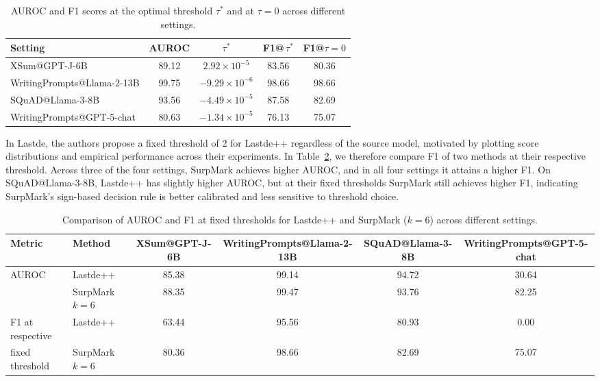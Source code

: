 \documentclass{article}
\theoremstyle{plain}
\theoremstyle{definition}
\theoremstyle{remark}
\begin{document}
\begin{table}[htbp]
\centering
{\scriptsize
\begin{tabular}{l c c c c}
\toprule
Setting                     & AUROC & $\tau^\ast$              & F1@$\,\tau^\ast$ & F1@$\tau=0$ \\
\midrule
XSum@GPT-J-6B               & 89.12 & $2.92\times 10^{-5}$     & 83.56            & 80.36       \\
WritingPrompts@Llama-2-13B  & 99.75 & $-9.29\times 10^{-6}$    & 98.66            & 98.66       \\
SQuAD@Llama-3-8B            & 93.56 & $-4.49\times 10^{-5}$    & 87.58            & 82.69       \\
WritingPrompts@GPT-5-chat   & 80.63 & $-1.34\times 10^{-5}$    & 76.13            & 75.07       \\
\bottomrule
\end{tabular}}
\caption{AUROC and F1 scores at the optimal threshold $\tau^\ast$ and at $\tau=0$ across different settings.}
\label{tab:tau-f1}
\end{table}

In Lastde, the authors propose a fixed threshold of 2 for Lastde++ regardless of the source model, motivated by plotting score distributions and empirical performance across their experiments. In Table~\ref{tab:metric-lastde-surpmark}, we therefore compare F1 of two methods at their respective threshold. Across three of the four settings, SurpMark achieves higher AUROC, and in all four settings it attains a higher F1. On SQuAD@Llama-3-8B, Lastde++ has slightly higher AUROC, but at their fixed thresholds SurpMark still achieves higher F1, indicating SurpMark's sign-based decision rule is better calibrated and less sensitive to threshold choice.

\begin{table}[htbp]
\centering
{\tiny
\begin{tabular}{l l c c c c}
\toprule
Metric                         & Method        & XSum@GPT-J-6B & WritingPrompts@Llama-2-13B & SQuAD@Llama-3-8B & WritingPrompts@GPT-5-chat \\
\midrule
AUROC                          & Lastde++      & 85.38         & 99.14                       & 94.72            & 30.64                     \\
                               & SurpMark $k=6$& 88.35         & 99.47                       & 93.76            & 82.25                     \\
F1 at respective& Lastde++    & 63.44         & 95.56                       & 80.93            & 0.00                      \\
fixed threshold                               & SurpMark $k=6$& 80.36         & 98.66                       & 82.69            & 75.07                     \\
\bottomrule
\end{tabular}}
\caption{Comparison of AUROC and F1 at fixed thresholds for Lastde++ and SurpMark ($k=6$) across different settings.}
\label{tab:metric-lastde-surpmark}
\end{table}
\end{document}
